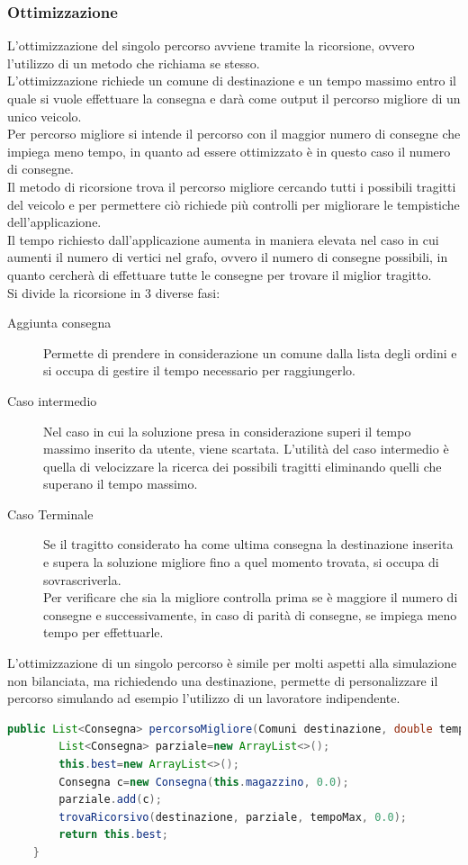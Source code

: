 \documentclass[a4paper,12pt]{report}
\begin{document}
\subsubsection{Ottimizzazione}
L'ottimizzazione del singolo percorso avviene tramite la ricorsione, ovvero l'utilizzo di un 
metodo che richiama se stesso.\\
L'ottimizzazione richiede un comune di destinazione e un tempo massimo entro il quale si vuole effettuare
la consegna e darà come output il percorso migliore di un unico veicolo.\\
Per percorso migliore si intende il percorso con il maggior numero di consegne che impiega meno
tempo, in quanto ad essere ottimizzato è in questo caso il numero di consegne.\\
Il metodo di ricorsione trova il percorso migliore cercando tutti i possibili tragitti del veicolo e
per permettere ciò richiede più controlli per migliorare le tempistiche dell'applicazione.\\
Il tempo richiesto dall'applicazione aumenta in maniera elevata nel caso in cui aumenti il numero
di vertici nel grafo, ovvero il numero di consegne possibili, in quanto cercherà di effettuare tutte
le consegne per trovare il miglior tragitto.\\
Si divide la ricorsione in 3 diverse fasi:
\begin{description}
\item[Aggiunta consegna] Permette di prendere in considerazione un comune dalla lista degli ordini e si occupa di gestire il tempo
necessario per raggiungerlo.
\item[Caso intermedio] Nel caso in cui la soluzione presa in considerazione superi il tempo massimo inserito da utente,
viene scartata.
L'utilità del caso intermedio è quella di velocizzare la ricerca dei possibili tragitti eliminando
quelli che superano il tempo massimo.
\item[Caso Terminale] Se il tragitto considerato ha come ultima consegna la destinazione inserita e  supera la soluzione migliore fino a quel momento trovata, si occupa di 
sovrascriverla.\\
Per verificare che sia la migliore controlla prima se è maggiore il numero di consegne e successivamente, in caso di parità di consegne, se impiega meno tempo per effettuarle.
\end{description}
L'ottimizzazione di un singolo percorso è simile per molti aspetti alla simulazione non bilanciata, ma richiedendo una destinazione, permette di personalizzare il percorso simulando ad esempio l'utilizzo
di un lavoratore indipendente.
\begin{center}
\begin{lstlisting}[caption={Metodo percorsoMigliore() della classe Model},  label={lst:percorsoMigliore},captionpos=b, language=Java]
	public List<Consegna> percorsoMigliore(Comuni destinazione, double tempoMax) {
		List<Consegna> parziale=new ArrayList<>();
		this.best=new ArrayList<>();
		Consegna c=new Consegna(this.magazzino, 0.0);
		parziale.add(c);
		trovaRicorsivo(destinazione, parziale, tempoMax, 0.0);
		return this.best;
	}
\end{lstlisting}
\end{center}
\end{document}
